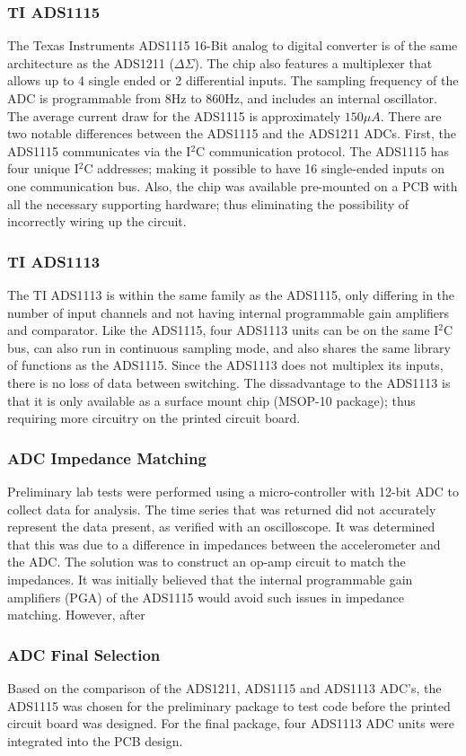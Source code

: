 \subsubsection{TI ADS1115}
\label{sec:ADC_ADS1115}
\indent The Texas Instruments ADS1115 16-Bit analog to digital converter is of the same architecture as the ADS1211 ($\Delta \Sigma$). The chip also
features a multiplexer that allows up to 4 single ended or 2 differential inputs. The sampling frequency of the ADC is programmable from 8Hz to 860Hz, and
includes an internal oscillator. The average current draw for the ADS1115 is approximately $150\mu A$. There are two notable differences between the
ADS1115 and the ADS1211 ADCs. First, the ADS1115 communicates via the I$^{2}$C communication protocol. The ADS1115 has four unique I$^{2}$C addresses;
making it possible to have 16 single-ended inputs on one communication bus. Also, the chip was available pre-mounted on a PCB with all the necessary
supporting hardware; thus eliminating the possibility of incorrectly wiring up the circuit. 
\subsubsection{TI ADS1113}
\label{sec:ADC_ADS1113}
\indent The TI ADS1113 is within the same family as the ADS1115, only differing in the number of input channels and not having internal programmable gain amplifiers and comparator.
Like the ADS1115, four ADS1113 units can be on the same I$^{2}$C bus, can also run in continuous sampling mode, and also shares the same library of functions as the ADS1115.
Since the ADS1113 does not multiplex its inputs, there is no loss of data between switching.
The dissadvantage to the ADS1113 is that it is only available as a surface mount chip (MSOP-10 package); thus requiring more circuitry on the printed circuit board.

\subsubsection{ADC Impedance Matching}
Preliminary lab tests were performed using a micro-controller with 12-bit ADC to collect data for analysis.
The time series that was returned did not accurately represent the data present, as verified with an oscilloscope.
It was determined that this was due to a difference in impedances between the accelerometer and the ADC.
The solution was to construct an op-amp circuit to match the impedances.
It was initially believed that the internal programmable gain amplifiers (PGA) of the ADS1115 would avoid such issues in impedance matching.
However, after 

\subsubsection{ADC Final Selection}
\indent Based on the comparison of the ADS1211, ADS1115 and ADS1113 ADC's, the ADS1115 was chosen for the preliminary package to test code before the printed circuit board was designed.
For the final package, four ADS1113 ADC units were integrated into the PCB design. 
